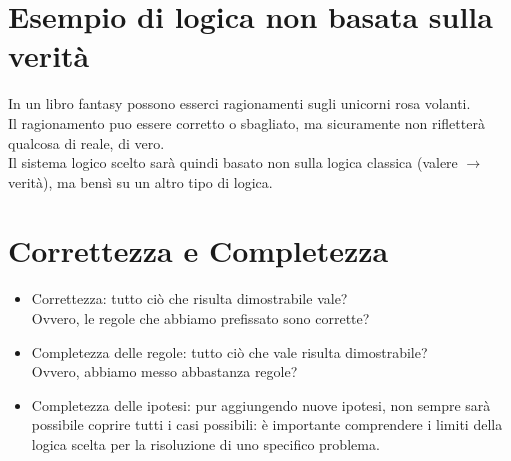\documentclass[12pt]{article}
\begin{document}
\section{Esempio di logica non basata sulla verità}
In un libro fantasy possono esserci ragionamenti sugli unicorni rosa volanti.\\
Il ragionamento puo essere corretto o sbagliato, ma sicuramente non rifletterà qualcosa di reale, di vero.\\
Il sistema logico scelto sarà quindi basato non sulla logica classica (valere $\rightarrow$ verità), ma bensì su un altro tipo di logica.
\section{Correttezza e Completezza}
\begin{itemize}
    \item Correttezza: tutto ciò che risulta dimostrabile vale?\\
    Ovvero, le regole che abbiamo prefissato sono corrette?
    \item Completezza delle regole: tutto ciò che vale risulta dimostrabile?\\
    Ovvero, abbiamo messo abbastanza regole?
    \item Completezza delle ipotesi: pur aggiungendo nuove ipotesi, non sempre sarà possibile coprire tutti i casi possibili: è importante comprendere i limiti della logica scelta per la risoluzione di uno specifico problema.
\end{itemize}
\end{document}
